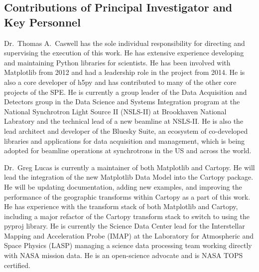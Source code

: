 \documentclass[12pt]{article}
\numberwithin{page}{section}
\begin{document}
\subsection{Contributions of Principal Investigator and Key Personnel}

Dr.\ Thomas A.\ Caswell has the sole individual responsibility for directing
and supervising the execution of this work.  He has extensive experience
developing and maintaining Python libraries for scientists.  He has been
involved with Matplotlib from 2012 and had a leadership role in the project
from 2014.  He is also a core developer of h5py and has contributed to many of
the other core projects of the SPE.  He is currently a group leader of the Data
Acquisition and Detectors group in the Data Science and Systems Integration
program at the National Synchrotron Light Source II (NSLS-II) at Brookhaven
National Labratory and the technical lead of a new beamline at NSLS-II.  He is
also the lead architect and developer of the Bluesky Suite, an ecosystem of
co-developed libraries and applications for data acquisition and management,
which is being adopted for beamline operations at synchrotrons in the US and
across the world.

Dr.\ Greg Lucas is currently a maintainer of both Matplotlib and Cartopy.
He will lead the integration of the new Matplotlib Data Model into the Cartopy package.
He will be updating documentation, adding new examples, and improving the performance of
the geographic transforms within Cartopy as a part of this work. He has experience
with the transform stack of both Matplotlib and Cartopy, including a major refactor
of the Cartopy transform stack to switch to using the pyproj library. He is currently
the Science Data Center lead for the Interstellar Mapping and Acceleration Probe (IMAP)
at the Laboratory for Atmospheric and Space Physics (LASP) managing a science data
processing team working directly with NASA mission data. He is an open-science advocate
and is NASA TOPS certified.
\end{document}
